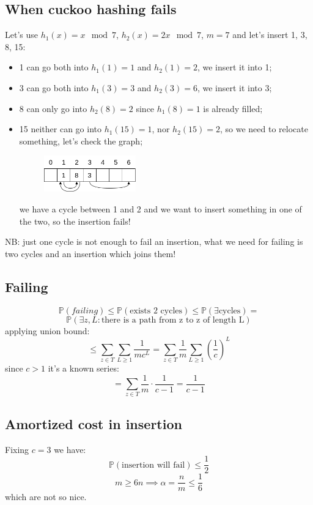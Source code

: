 \subsection{When cuckoo hashing fails}
Let's use $h_1(x) = x \mod 7$, $h_2(x) = 2x \mod 7$, $m = 7$ and let's insert 1, 3, 8, 15:
\begin{itemize}
    \item 1 can go both into $h_1(1) = 1$ and $h_2(1) = 2$, we insert it into 1;
    \item 3 can go both into $h_1(3) = 3$ and $h_2(3) = 6$, we insert it into 3;
    \item 8 can only go into $h_2(8) = 2$ since $h_1(8) = 1$ is already filled;
    \item 15 neither can go into $h_1(15) = 1$, nor $h_2(15) = 2$, so we need to relocate something, let's check the graph;
    \begin{figure}[H]
        \centering
        \includegraphics[width=150px]{images/7_Hashing/cuckoo_hashing_cycle.png}
    \end{figure}
    we have a cycle between 1 and 2 and we want to insert something in one of the two, so the insertion fails!
\end{itemize}

NB: just one cycle is not enough to fail an insertion, what we need for failing is two cycles and an insertion which joins them!

\subsection{Failing}
$$
    \mathbb{P}(failing) \leq \mathbb{P}(\text{exists 2 cycles}) \leq \mathbb{P}(\exists \text{cycles}) =
$$
$$
    \mathbb{P}(\exists z, L: \text{there is a path from z to z of length L})
$$
applying union bound:
$$
    \leq \sum_{z \in T} \sum_{L \geq 1} \frac{1}{mc^L} = \sum_{z \in T} \frac{1}{m} \sum_{L \geq 1} \left( \frac{1}{c} \right)^L
$$
since $c > 1$ it's a known series:
$$
    = \sum_{z \in T} \frac{1}{m} \cdot \frac{1}{c-1} = \frac{1}{c-1}
$$

\subsection{Amortized cost in insertion}
Fixing $c=3$ we have:
$$
    \mathbb{P}(\text{insertion will fail}) \leq \frac{1}{2}
$$
$$
    m \geq 6n \implies \alpha = \frac{n}{m} \leq \frac{1}{6}
$$
which are not so nice.

